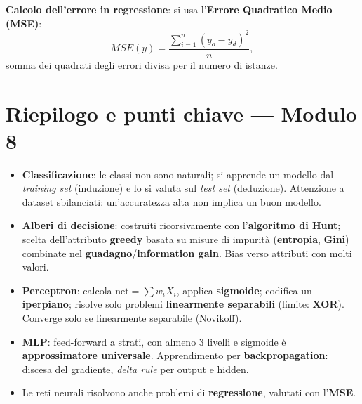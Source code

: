 \documentclass[11pt,a4paper]{report}
\begin{document}
\textbf{Calcolo dell'errore in regressione}: si usa l'\textbf{Errore Quadratico Medio (MSE)}:
\[
MSE(y) = \frac{\sum_{i=1}^{n} (y_o - y_d)^2}{n},
\]
somma dei quadrati degli errori divisa per il numero di istanze.

\section*{Riepilogo e punti chiave --- Modulo 8}

\begin{itemize}
  \item \textbf{Classificazione}: le classi non sono naturali; si apprende un modello dal \emph{training set} (induzione) e lo si valuta sul \emph{test set} (deduzione). Attenzione a dataset sbilanciati: un'accuratezza alta non implica un buon modello.
  \item \textbf{Alberi di decisione}: costruiti ricorsivamente con l'\textbf{algoritmo di Hunt}; scelta dell'attributo \textbf{greedy} basata su misure di impurità (\textbf{entropia}, \textbf{Gini}) combinate nel \textbf{guadagno}/\textbf{information gain}. Bias verso attributi con molti valori.
  \item \textbf{Perceptron}: calcola $\text{net}=\sum w_i X_i$, applica \textbf{sigmoide}; codifica un \textbf{iperpiano}; risolve solo problemi \textbf{linearmente separabili} (limite: \textbf{XOR}). Converge solo se linearmente separabile (Novikoff).
  \item \textbf{MLP}: feed-forward a strati, con almeno 3 livelli e sigmoide è \textbf{approssimatore universale}. Apprendimento per \textbf{backpropagation}: discesa del gradiente, \emph{delta rule} per output e hidden.
  \item Le reti neurali risolvono anche problemi di \textbf{regressione}, valutati con l'\textbf{MSE}.
\end{itemize}
\end{document}
